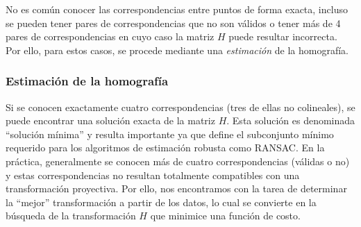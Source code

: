 No es común conocer las correspondencias entre puntos de forma exacta, incluso se pueden tener pares de correspondencias que no son válidos o tener más de 4 pares de correspondencias en cuyo caso la matriz $\textit{H}$ puede resultar incorrecta. Por ello, para estos casos, se procede mediante una \textit{estimación} de la homografía.

\subsubsection{Estimación de la homografía}
\label{sec:estimacion_ransac_homografia}
Si se conocen exactamente cuatro correspondencias (tres de ellas no colineales), se puede encontrar una solución exacta de la matriz $\textit{H}$. Esta solución es denominada ``solución mínima'' y resulta importante ya que define el subconjunto mínimo requerido para los algoritmos de estimación robusta como RANSAC. En la práctica, generalmente se conocen más de cuatro correspondencias (válidas o no) y estas correspondencias no resultan totalmente compatibles con una transformación proyectiva. Por ello, nos encontramos con la tarea de determinar la ``mejor'' transformación a partir de los datos, lo cual se convierte en la búsqueda de la transformación $\textit{H}$ que minimice una función de costo.
